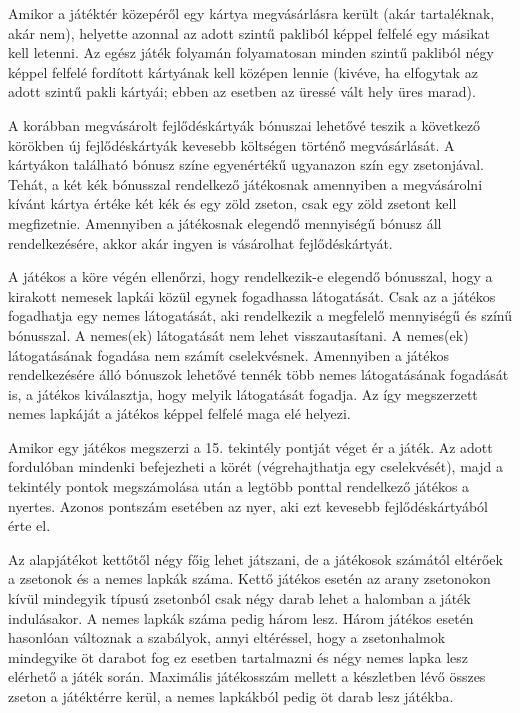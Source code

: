 Amikor a játéktér közepéről egy kártya megvásárlásra került (akár tartaléknak, akár nem), helyette azonnal az adott szintű pakliból képpel felfelé egy másikat kell letenni. Az egész játék folyamán folyamatosan minden szintű pakliból négy képpel felfelé fordított kártyának kell középen lennie (kivéve, ha elfogytak az adott szintű pakli kártyái; ebben az esetben az üressé vált hely üres marad).

A korábban megvásárolt fejlődéskártyák bónuszai lehetővé teszik a következő körökben új fejlődéskártyák kevesebb költségen történő megvásárlását. A kártyákon található bónusz színe egyenértékű ugyanazon szín egy zsetonjával. Tehát, a két kék bónusszal rendelkező játékosnak amennyiben a megvásárolni kívánt kártya értéke két kék és egy zöld zseton, csak egy zöld zsetont kell megfizetnie. Amennyiben a játékosnak elegendő mennyiségű bónusz áll rendelkezésére, akkor akár ingyen is vásárolhat fejlődéskártyát.

A játékos a köre végén ellenőrzi, hogy rendelkezik-e elegendő bónusszal, hogy a kirakott nemesek lapkái közül egynek fogadhassa látogatását. Csak az a játékos fogadhatja egy nemes látogatását, aki rendelkezik a megfelelő mennyiségű és színű bónusszal. A nemes(ek) látogatását nem lehet visszautasítani. A nemes(ek) látogatásának fogadása nem számít cselekvésnek. Amennyiben a játékos rendelkezésére álló bónuszok lehetővé tennék több nemes látogatásának fogadását is, a játékos kiválasztja, hogy melyik látogatását fogadja. Az így megszerzett nemes lapkáját a játékos képpel felfelé maga elé helyezi.

Amikor egy játékos megszerzi a 15. tekintély pontját véget ér a játék. Az adott fordulóban mindenki befejezheti a körét (végrehajthatja egy cselekvését), majd a tekintély pontok megszámolása után a legtöbb ponttal rendelkező játékos a nyertes. Azonos pontszám esetében az nyer, aki ezt kevesebb fejlődéskártyából érte el.



Az alapjátékot kettőtől négy főig lehet játszani, de a játékosok számától eltérőek a zsetonok és a nemes lapkák száma. Kettő játékos esetén az arany zsetonokon kívül mindegyik típusú zsetonból csak négy darab lehet a halomban a játék indulásakor. A nemes lapkák száma pedig három lesz. Három játékos esetén hasonlóan változnak a szabályok, annyi eltéréssel, hogy a zsetonhalmok mindegyike öt darabot fog ez esetben tartalmazni és négy nemes lapka lesz elérhető a játék során. Maximális játékosszám mellett a készletben lévő összes zseton a játéktérre kerül, a nemes lapkákból pedig öt darab lesz játékba.

